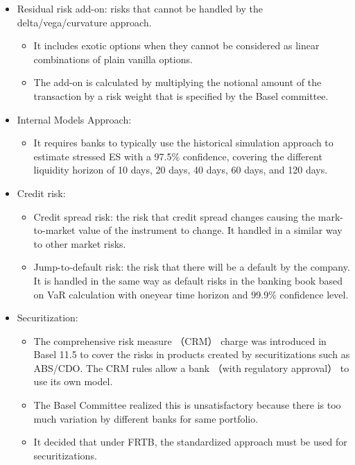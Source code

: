 \begin{itemize}
\item Residual risk add-on: risks that cannot be handled by the
delta/vega/curvature approach.
    \begin{itemize}
    \item It includes exotic options when they cannot be considered as linear combinations of plain vanilla options.
    \item The add-on is calculated by multiplying the notional amount of the transaction by a risk weight that is specified by the Basel committee.
    \end{itemize}
\item Internal Models Approach:
    \begin{itemize}
    \item It requires banks to typically use the historical simulation approach to estimate stressed ES with a 97.5\% confidence, covering the different liquidity horizon of 10 days, 20 days, 40 days, 60 days, and 120 days.
    \end{itemize}
\item Credit risk:

    \begin{itemize}
    \item Credit spread risk: the risk that credit spread changes causing the mark-to-market value of the instrument to change. It handled in a similar way to other market risks.
    \item Jump-to-default risk: the risk that there will be a default by the company. It is handled in the same way as default risks in the banking book based on VaR calculation with oneyear time horizon and 99.9\% confidence level.
    \end{itemize}   

\item Securitization:
    \begin{itemize}
    \item The comprehensive risk measure （CRM） charge was introduced in Basel 11.5 to cover the risks in products created by securitizations such as ABS/CDO. The CRM rules allow a bank （with regulatory approval） to use its own model.
    \item The Basel Committee realized this is unsatisfactory because there is too much variation by different banks for same portfolio.
    \item It decided that under FRTB, the standardized approach must be used for securitizations.
    \end{itemize}

\end{itemize}


